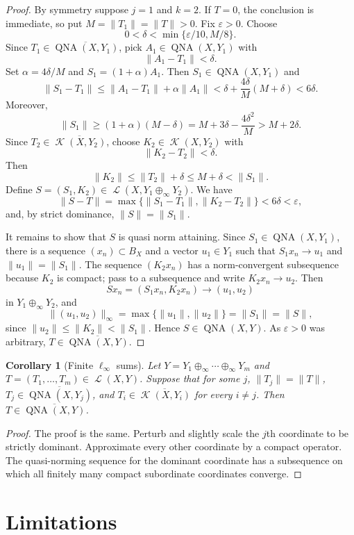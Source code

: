 \documentclass[11pt]{article}
\newtheorem{corollary}{Corollary}
\DeclareMathOperator{\QNA}{QNA}
\DeclareMathOperator{\Lin}{\mathcal L}
\DeclareMathOperator{\K}{\mathcal K}
\begin{document}
\begin{proof}
By symmetry suppose $j=1$ and $k=2$. If $T=0$, the conclusion is immediate, so
put $M=\|T_1\|=\|T\|>0$. Fix $\varepsilon>0$. Choose
\[
  0<\delta<\min\{\varepsilon/10,M/8\}.
\]
Since $T_1\in \overline{\QNA(X,Y_1)}$, pick $A_1\in\QNA(X,Y_1)$ with
\[
  \|A_1-T_1\|<\delta.
\]
Set $\alpha=4\delta/M$ and $S_1=(1+\alpha)A_1$. Then $S_1\in\QNA(X,Y_1)$ and
\[
  \|S_1-T_1\|
  \leq \|A_1-T_1\|+\alpha\|A_1\|
  < \delta+\frac{4\delta}{M}(M+\delta)
  < 6\delta.
\]
Moreover,
\[
  \|S_1\|
  \geq (1+\alpha)(M-\delta)
  = M+3\delta-\frac{4\delta^2}{M}
  > M+2\delta .
\]
Since $T_2\in\overline{\K(X,Y_2)}$, choose $K_2\in\K(X,Y_2)$ with
\[
  \|K_2-T_2\|<\delta .
\]
Then
\[
  \|K_2\|\leq \|T_2\|+\delta\leq M+\delta<\|S_1\|.
\]
Define $S=(S_1,K_2)\in \Lin(X,Y_1\oplus_\infty Y_2)$. We have
\[
  \|S-T\|=\max\{\|S_1-T_1\|,\|K_2-T_2\|\}<6\delta<\varepsilon,
\]
and, by strict dominance, $\|S\|=\|S_1\|$.

It remains to show that $S$ is quasi norm attaining. Since $S_1\in\QNA(X,Y_1)$,
there is a sequence $(x_n)\subset B_X$ and a vector $u_1\in Y_1$ such that
$S_1x_n\to u_1$ and $\|u_1\|=\|S_1\|$. The sequence $(K_2x_n)$ has a
norm-convergent subsequence because $K_2$ is compact; pass to a subsequence and
write $K_2x_n\to u_2$. Then
\[
  Sx_n=(S_1x_n,K_2x_n)\longrightarrow (u_1,u_2)
\]
in $Y_1\oplus_\infty Y_2$, and
\[
  \|(u_1,u_2)\|_\infty
  =\max\{\|u_1\|,\|u_2\|\}
  =\|S_1\|
  =\|S\|,
\]
since $\|u_2\|\leq \|K_2\|<\|S_1\|$. Hence $S\in \QNA(X,Y)$.
As $\varepsilon>0$ was arbitrary, $T\in\overline{\QNA(X,Y)}$.
\end{proof}

\begin{corollary}[Finite $\ell_\infty$ sums]
Let $Y=Y_1\oplus_\infty\cdots\oplus_\infty Y_m$ and
$T=(T_1,\ldots,T_m)\in\Lin(X,Y)$. Suppose that for some $j$,
$\|T_j\|=\|T\|$, $T_j\in\overline{\QNA(X,Y_j)}$, and
$T_i\in\overline{\K(X,Y_i)}$ for every $i\neq j$. Then
$T\in\overline{\QNA(X,Y)}$.
\end{corollary}

\begin{proof}
The proof is the same. Perturb and slightly scale the $j$th coordinate to be
strictly dominant. Approximate every other coordinate by a compact operator.
The quasi-norming sequence for the dominant coordinate has a subsequence on
which all finitely many compact subordinate coordinates converge.
\end{proof}

\section*{Limitations}
\end{document}
